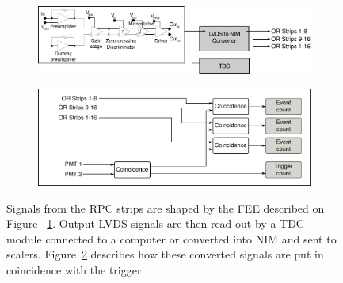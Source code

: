 			\begin{figure}[!h]
			\begin{subfigure}{\linewidth}
				\centering
				\includegraphics[width = \plotwidth]{fig/chapt5/pulse-processing.pdf}\\
				\caption{\label{fig:DAQ:A}}
			\end{subfigure}
			\begin{subfigure}{\linewidth}
				\centering
				\includegraphics[width = \plotwidth]{fig/chapt5/pulse-processing-2.pdf}
				\caption{\label{fig:DAQ:B}}
			\end{subfigure}
			\caption{\label{fig:DAQ} Signals from the RPC strips are shaped by the FEE described on Figure ~\ref{fig:DAQ:A}. Output LVDS signals are then read-out by a TDC module connected to a computer or converted into NIM and sent to scalers. Figure~\ref{fig:DAQ:B} describes how these converted signals are put in coincidence with the trigger.}
		\end{figure}
		
